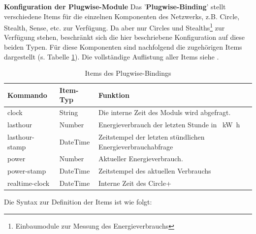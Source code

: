 \textbf{Konfiguration der Plugwise-Module}
Das '\textbf{Plugwise-Binding}' stellt verschiedene Items für die einzelnen Komponenten des Netzwerks, z.B. Circle, Stealth, Sense, etc. zur Verfügung. Da aber nur Circles und Stealths\footnote{Einbaumodule zur Messung des Energieverbrauchs} zur Verfügung stehen, beschränkt sich die hier beschriebene Konfiguration auf diese beiden Typen. \newline
Für diese Komponenten sind nachfolgend die zugehörigen Items dargestellt (s. Tabelle \ref{tbl:oh}). Die vollständige Auflistung aller Items siehe \cite{c4}.

\begin{center}
	\begin{table}[H]
		\centering
		\setlength\extrarowheight{2pt}
		\begin{tabularx}{\textwidth}{lXX}  
			\toprule
			Kommando & Item-Typ  & Funktion  \\
			\midrule
			clock 	&  String      	& Die interne Zeit des Moduls wird abgefragt.\\
			lasthour 	&  Number 		& Energieverbrauch der letzten Stunde in \SI{}{\kilo\watt\hour}\\
			lasthour- stamp &	DateTime	& Zeitstempel der letzten stündlichen Energieverbrauchabfrage\\
			power   & 	Number			& Aktueller Energieverbrauch.\\
			power-stamp       & DateTime  & Zeitstempel des aktuellen Verbrauchs     \\
			realtime-clock    & DateTime  & Interne Zeit des Circle+   \\
			\bottomrule
		\end{tabularx}
		\caption{Items des Plugwise-Bindings}
		\label{tbl:oh}
	\end{table}
\end{center}

Die Syntax zur Definition der Items ist wie folgt:

